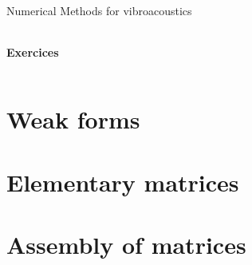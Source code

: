 \documentclass[10pt,a4paper]{report}
\begin{document}
\begin{center}
{\Large Numerical Methods for vibroacoustics }
 \begin{tabularx}{\linewidth}{c}
\hline
\end{tabularx}
\end{center}
\begin{center}
 {\Large \textbf{Exercices}\\}
\end{center}
 \begin{tabularx}{\linewidth}{c}
\hline
\end{tabularx}
\setcounter{chapter}{1}



\section{Weak forms}






\section{Elementary matrices}






\section{Assembly of matrices}



\end{document}
